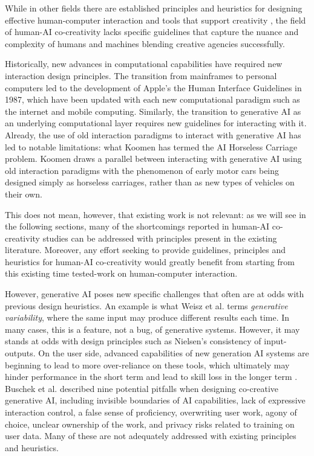 While in other fields there are established principles and heuristics for designing effective human-computer interaction and tools that support creativity \cite{Nielsen1994-df, Amershi2019-vy, Shneiderman2020-je, Wright2020-nt, Bengler2012-jf, Resnick2005-fs}, the field of human-AI co-creativity lacks specific guidelines that capture the nuance and complexity of humans and machines blending creative agencies successfully. 

Historically, new advances in computational capabilities have required new interaction design principles. The transition from mainframes to personal computers led to the development of Apple's the Human Interface Guidelines in 1987, which have been updated with each new computational paradigm such as the internet and mobile computing. Similarly, the transition to generative AI as an underlying computational layer requires new guidelines for interacting with it. Already, the use of old interaction paradigms to interact with generative AI has led to notable limitations: what Koomen \cite{Koomen2025-eu} has termed the AI Horseless Carriage problem. Koomen draws a parallel between interacting with generative AI using old interaction paradigms with the phenomenon of early motor cars being designed simply as horseless carriages, rather than as new types of vehicles on their own. 

This does not mean, however, that existing work is not relevant: as we will see in the following sections, many of the shortcomings reported in human-AI co-creativity studies can be addressed with principles present in the existing literature. Moreover, any effort seeking to provide guidelines, principles and heuristics for human-AI co-creativity would greatly benefit from starting from this existing time tested-work on human-computer interaction. 

However, generative AI poses new specific challenges that often are at odds with previous design heuristics. An example is what Weisz et al. \cite{Weisz2024-io} terms \textit{generative variability}, where the same input may produce different results each time. In many cases, this is a feature, not a bug, of generative systems. However, it may stands at odds with design principles such as Nielsen's consistency \cite{Nielsen1994-df} of input-outputs. On the user side, advanced capabilities of new generation AI systems are beginning to lead to more over-reliance on these tools, which ultimately may hinder performance in the short term and lead to skill loss in the longer term \cite{Buschek2021-ks, Dell-Acqua2022-dy, Gerlich2025-as}. Buschek et al. \cite{Buschek2021-ks} described nine potential pitfalls when designing co-creative generative AI, including invisible boundaries of AI capabilities, lack of expressive interaction control, a false sense of proficiency, overwriting user work, agony of choice, unclear ownership of the work, and privacy risks related to training on user data. Many of these are not adequately addressed with existing principles and heuristics.

